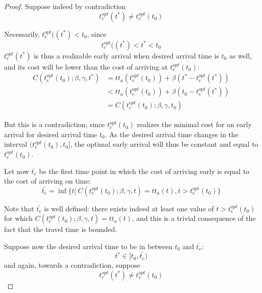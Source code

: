 \begin{proof}
  Suppose indeed by contradiction
  \begin{equation*}
    t_e^{opt}(t^*) \neq t_e^{opt}(t_0)
  \end{equation*}

  Necessarily, \(t_e^{opt}((t^*) < t_0\), since
  \begin{equation*}
    t_e^{opt}((t^*) < t^* < t_0
  \end{equation*}
  \(t_e^{opt}(t^*)\) is thus a realizable early arrival when desired arrival time is \(t_0\) as well,
  and its cost will be lower than the cost of arriving at \(t_e^{opt}(t_0)\):
  \begin{align*}
    C(t_e^{opt}(t_0); \beta, \gamma, t^*) & = tt_a(t_e^{opt}(t_0)) + \beta(t^* - t_e^{opt}(t^*)) \\
    & < tt_a(t_e^{opt}(t_0)) + \beta(t_0 - t_e^{opt}(t^*)) \\
    & = C(t_e^{opt}(t_0); \beta, \gamma, t_0)
  \end{align*}

  But this is a contradiction, since \(t_e^{opt}(t_0)\) realizes the minimal cost for an early arrival for desired arrival time \(t_0\).
  As the desired arrival time changes in the interval \((t_e^{opt}(t_0), t_0]\),
  the optimal early arrival will thus be constant and equal to \(t_e^{opt}(t_0)\).

  Let now \(\bar{t_e}\) be the first time point in which the cost of arriving early is equal to the cost of arriving on time:
  \begin{equation*}
    \bar{t_e} = \inf\{t |\ C(t_e^{opt}(t_0); \beta, \gamma, t) = tt_a(t), t > t_e^{opt}(t_0)\}
  \end{equation*}

  Note that \(\bar{t_e}\) is well defined:
  there exists indeed at least one value of \(t > t_e^{opt}(t_0)\) for which \(C(t_e^{opt}(t_0); \beta, \gamma, t) = tt_a(t)\),
  and this is a trivial consequence of the fact that the travel time is bounded.

  Suppose now the desired arrival time to be in between \(t_0\) and \(\bar{t_e}\):
  \begin{equation*}
    t^* \in [t_0, \bar{t_e})
  \end{equation*}
  and again, towards a contradiction, suppose
  \begin{equation*}
    t_e^{opt}(t^*) \neq t_e^{opt}(t_0)
  \end{equation*}


\end{proof}
